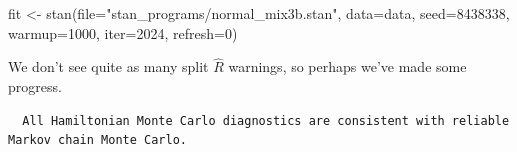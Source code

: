 \documentclass[
  letterpaper,
  DIV=11,
  numbers=noendperiod]{scrartcl}
\newenvironment{Shaded}{\begin{snugshade}}{\end{snugshade}}
\newcommand{\AttributeTok}[1]{\textcolor[rgb]{0.40,0.45,0.13}{#1}}
\newcommand{\ConstantTok}[1]{\textcolor[rgb]{0.56,0.35,0.01}{#1}}
\newcommand{\DecValTok}[1]{\textcolor[rgb]{0.68,0.00,0.00}{#1}}
\newcommand{\FunctionTok}[1]{\textcolor[rgb]{0.28,0.35,0.67}{#1}}
\newcommand{\NormalTok}[1]{\textcolor[rgb]{0.00,0.23,0.31}{#1}}
\newcommand{\OtherTok}[1]{\textcolor[rgb]{0.00,0.23,0.31}{#1}}
\newcommand{\SpecialCharTok}[1]{\textcolor[rgb]{0.37,0.37,0.37}{#1}}
\newcommand{\StringTok}[1]{\textcolor[rgb]{0.13,0.47,0.30}{#1}}
\begin{document}
\begin{Shaded}
\begin{Highlighting}[]
\NormalTok{fit }\OtherTok{\textless{}{-}} \FunctionTok{stan}\NormalTok{(}\AttributeTok{file=}\StringTok{"stan\_programs/normal\_mix3b.stan"}\NormalTok{,}
            \AttributeTok{data=}\NormalTok{data, }\AttributeTok{seed=}\DecValTok{8438338}\NormalTok{,}
            \AttributeTok{warmup=}\DecValTok{1000}\NormalTok{, }\AttributeTok{iter=}\DecValTok{2024}\NormalTok{, }\AttributeTok{refresh=}\DecValTok{0}\NormalTok{)}
\end{Highlighting}
\end{Shaded}

We don't see quite as many split \(\hat{R}\) warnings, so perhaps we've
made some progress.

\begin{Shaded}
\end{Shaded}

\begin{verbatim}
  All Hamiltonian Monte Carlo diagnostics are consistent with reliable
Markov chain Monte Carlo.
\end{verbatim}

\begin{Shaded}
\end{Shaded}
\end{document}
